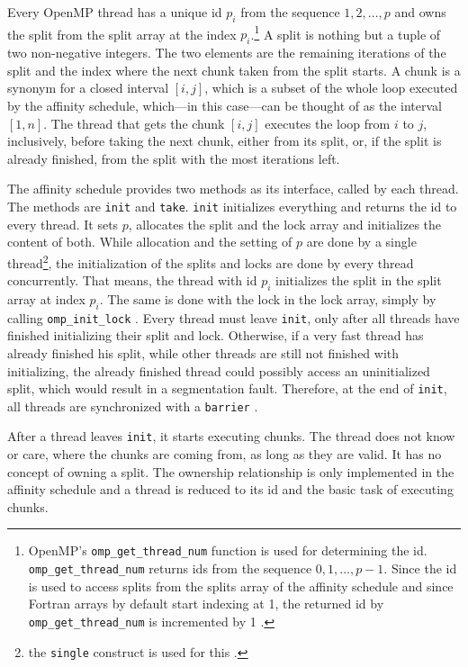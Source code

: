 \documentclass[twoside,11pt]{article}
\begin{document}
Every OpenMP thread has a unique id $p_i$ from the sequence
$1,2,\dots,p$ and owns the split from the split array at
the index $p_i$.\footnote{%
  OpenMP's \texttt{omp\_get\_thread\_num} function is used
  for determining the id.
  \texttt{omp\_get\_thread\_num} returns ids from the
  sequence $0,1,\dots,p-1$. Since the id is used to access
  splits from the splits array of the affinity schedule and
  since Fortran arrays by default start indexing at 1, the
  returned id by \texttt{omp\_get\_thread\_num} is
  incremented by 1 \citep[see][Chapter 3]{omp}.}
A split is nothing but a tuple of two non-negative
integers. The two elements are the remaining iterations of
the split and the index where the next chunk taken from the
split starts.
A chunk is a synonym for a closed interval $[i, j]$, which
is a subset of the whole loop executed by the affinity
schedule, which---in this case---can be thought of as the
interval $[1, n]$.
The thread that gets the chunk $[i, j]$ executes the loop
from $i$ to $j$, inclusively, before taking the next chunk,
either from its split, or, if the split is already
finished, from the split with the most iterations left.

The affinity schedule provides two methods as its
interface, called by each thread.
The methods are \texttt{init} and \texttt{take}.
\texttt{init} initializes everything and returns the id
to every thread.
It sets $p$, allocates the split and the lock array and
initializes the content of both.
While allocation and the setting of $p$ are done by a
single thread\footnote{the \texttt{single} construct is
  used for this \citep[see][Chapter 2]{omp}.},
the initialization of the splits and locks
are done by every thread concurrently.
That means, the thread with id $p_i$ initializes the split
in the split array at index $p_i$.
The same is done with the lock in the lock array, simply
by calling \texttt{omp\_init\_lock}
\citep[see][Chapter 3]{omp}.
Every thread must leave \texttt{init}, only after all
threads have finished initializing their split and lock.
Otherwise, if a very fast thread has already finished his
split, while other threads are still not finished with
initializing, the already finished thread could possibly
access an uninitialized split, which would result in a
segmentation fault.
Therefore, at the end of \texttt{init}, all threads are
synchronized with a \texttt{barrier}
\citep[see][Chapter 2]{omp}.

After a thread leaves \texttt{init}, it starts executing
chunks.
The thread does not know or care, where the chunks are
coming from, as long as they are valid.
It has no concept of owning a split.
The ownership relationship is only implemented in the
affinity schedule and a thread is reduced to its id and
the basic task of executing chunks.
\end{document}
